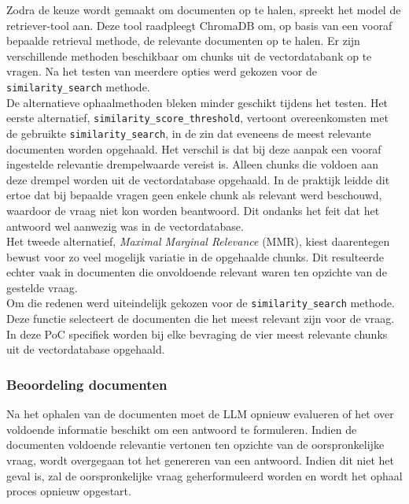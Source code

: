 Zodra de keuze wordt gemaakt om documenten op te halen, spreekt het model de retriever-tool aan. Deze tool raadpleegt ChromaDB om, op basis van een vooraf bepaalde retrieval methode, de relevante documenten op te halen. Er zijn verschillende methoden beschikbaar om chunks uit de vectordatabank op te vragen. Na het testen van meerdere opties werd gekozen voor de \verb|similarity_search| methode.
\\[1em]
De alternatieve ophaalmethoden bleken minder geschikt tijdens het testen. Het eerste alternatief, \verb|similarity_score_threshold|, vertoont overeenkomsten met de gebruikte \verb|similarity_search|, in de zin dat eveneens de meest relevante documenten worden opgehaald. Het verschil is dat bij deze aanpak een vooraf ingestelde relevantie drempelwaarde vereist is. Alleen chunks die voldoen aan deze drempel worden uit de vectordatabase opgehaald. In de praktijk leidde dit ertoe dat bij bepaalde vragen geen enkele chunk als relevant werd beschouwd, waardoor de vraag niet kon worden beantwoord. Dit ondanks het feit dat het antwoord wel aanwezig was in de vectordatabase.  
\\[1em]
Het tweede alternatief, \textit{Maximal Marginal Relevance} (MMR), kiest daarentegen bewust voor zo veel mogelijk variatie in de opgehaalde chunks. Dit resulteerde echter vaak in documenten die onvoldoende relevant waren ten opzichte van de gestelde vraag.  
\\[1em]
Om die redenen werd uiteindelijk gekozen voor de \verb|similarity_search| methode. Deze functie selecteert de documenten die het meest relevant zijn voor de vraag. In deze PoC specifiek worden bij elke bevraging de vier meest relevante chunks uit de vectordatabase opgehaald.

\subsubsection{Beoordeling documenten}

Na het ophalen van de documenten moet de LLM opnieuw evalueren of het over voldoende informatie beschikt om een antwoord te formuleren. Indien de documenten voldoende relevantie vertonen ten opzichte van de oorspronkelijke vraag, wordt overgegaan tot het genereren van een antwoord. Indien dit niet het geval is, zal de oorspronkelijke vraag geherformuleerd worden en wordt het ophaal proces opnieuw opgestart.


